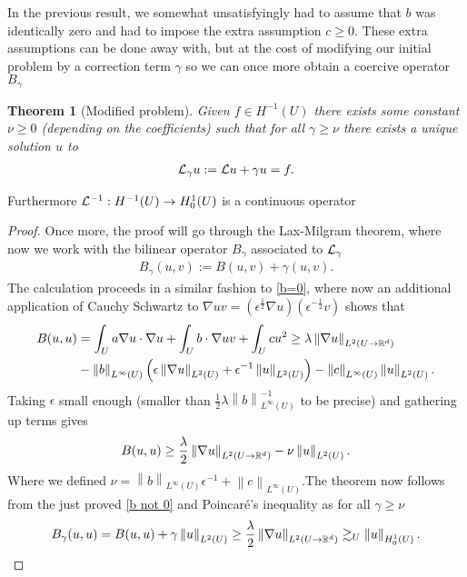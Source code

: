 \documentclass[12pt]{article}
\newtheorem{theorem}{Theorem}
\renewcommand{\norm}[1]{\left\lVert #1 \right\rVert}\renewcommand{\abs}[1]{\left| #1 \right|}
\newcommand{\qt}[1]{\left(#1\right)}
\begin{document}
In the previous result, we somewhat unsatisfyingly had to assume that $ b$ was identically zero and had to impose the extra assumption  $c \geq 0$. These extra assumptions can be done away with, but at the cost of modifying our initial problem by a correction term $\gamma $ so we can once more obtain a coercive operator $B_\gamma $
\begin{theorem}[Modified problem]\label{mod}
	Given $f \in  H^{-1}(U)$ there exists some constant $\nu \geq 0$ (depending on the coefficients) such that for all $\gamma \geq \nu$  there exists a unique solution $u$ to
	\begin{align*}
		\mathcal{L}_\gamma u:= \mathcal{L} u+ \gamma u=f.
	\end{align*}
\end{theorem}
Furthermore $\mathcal{L}^{-1}: H^{-1}(U) \to H^1_0(U)$ is a continuous operator
\begin{proof}
	Once more, the proof will go through the Lax-Milgram theorem, where now we work with the bilinear operator $B_\gamma  $ associated to $\mathcal{L}_\gamma  $
	\begin{align*}
		B_\gamma  (u,v):= B(u,v) + \gamma  (u,v).
	\end{align*}
	The calculation proceeds in a similar fashion to  \eqref{b=0}, where now an additional application of Cauchy Schwartz to $\nabla u v = (\epsilon^{\frac{1}{2}} \nabla u)(\epsilon^{-\frac{1}{2}}v)$  shows that
	\begin{align*}
		B(u,u) & = \int_{U}a \nabla u \cdot \nabla u + \int_{U} b\cdot  \nabla u v +  \int_{U} cu^2 \geq \lambda \norm{\nabla u}_{L^2(U \to \R^d)}           \\
		       & - \norm{b}_{L^\infty(U)} \qt{\epsilon \norm{\nabla u}_{L^2(U)}+ \epsilon ^{-1}\norm{u}_{L^2(U)}}- \norm{c}_{L^\infty(U)}\norm{u}_{L^2(U)} .
	\end{align*}
	Taking $\epsilon $ small enough (smaller than $\frac{1}{2} \lambda \norm{b}_{L^\infty(U)}^{-1}$ to be precise) and gathering up terms gives
	\begin{align}\label{b not 0}
		B(u,u) \geq \frac{\lambda}{2} \norm{\nabla u}_{L^2(U \to \R^d)} -\nu \norm{u}_{L^2(U)}.
	\end{align}
	Where we defined $\nu = \norm{b}_{L^\infty(U)} \epsilon ^{-1}+\norm{c}_{L^\infty(U)}$.The theorem now follows from the just proved \eqref{b not 0} and Poincaré's inequality as for all $\gamma \geq \nu$
	\begin{align*}
		B_\gamma (u,u)=B(u,u)+ \gamma \norm{u}_{L^2(U)} \geq\frac{\lambda}{2} \norm{\nabla u}_{L^2(U \to \R^d)}\gtrsim _U \norm{u}_{H_0^1(U)} .
	\end{align*}
\end{proof}
\end{document}
